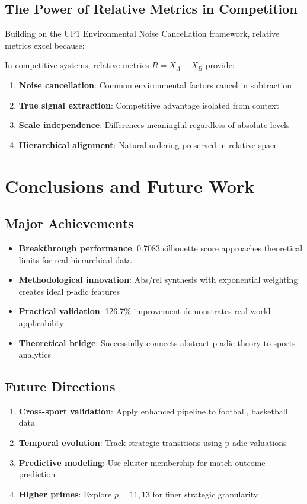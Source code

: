\subsection{The Power of Relative Metrics in Competition}

Building on the UP1 Environmental Noise Cancellation framework, relative metrics excel because:

\begin{proposition}
In competitive systems, relative metrics $R = X_A - X_B$ provide:
\begin{enumerate}
    \item \textbf{Noise cancellation}: Common environmental factors cancel in subtraction
    \item \textbf{True signal extraction}: Competitive advantage isolated from context
    \item \textbf{Scale independence}: Differences meaningful regardless of absolute levels
    \item \textbf{Hierarchical alignment}: Natural ordering preserved in relative space
\end{enumerate}
\end{proposition}

\section{Conclusions and Future Work}

\subsection{Major Achievements}

\begin{itemize}
    \item \textbf{Breakthrough performance}: 0.7083 silhouette score approaches theoretical limits for real hierarchical data
    \item \textbf{Methodological innovation}: Abs/rel synthesis with exponential weighting creates ideal p-adic features
    \item \textbf{Practical validation}: 126.7\% improvement demonstrates real-world applicability
    \item \textbf{Theoretical bridge}: Successfully connects abstract p-adic theory to sports analytics
\end{itemize}

\subsection{Future Directions}

\begin{enumerate}
    \item \textbf{Cross-sport validation}: Apply enhanced pipeline to football, basketball data
    \item \textbf{Temporal evolution}: Track strategic transitions using p-adic valuations
    \item \textbf{Predictive modeling}: Use cluster membership for match outcome prediction
    \item \textbf{Higher primes}: Explore $p = 11, 13$ for finer strategic granularity
\end{enumerate}